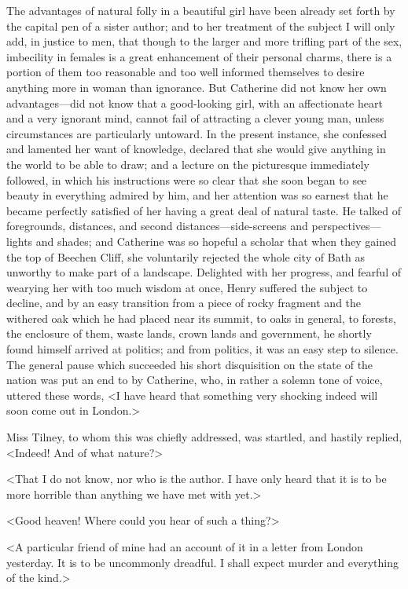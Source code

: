  The advantages of natural folly in a beautiful girl have been already set forth by the capital pen of a sister author; and to her treatment of the subject I will only add, in justice to men, that though to the larger and more trifling part of the sex, imbecility in females is a great enhancement of their personal charms, there is a portion of them too reasonable and too well informed themselves to desire anything more in woman than ignorance. But Catherine did not know her own advantages—did not know that a good-looking girl, with an affectionate heart and a very ignorant mind, cannot fail of attracting a clever young man, unless circumstances are particularly untoward. In the present instance, she confessed and lamented her want of knowledge, declared that she would give anything in the world to be able to draw; and a lecture on the picturesque immediately followed, in which his instructions were so clear that she soon began to see beauty in everything admired by him, and her attention was so earnest that he became perfectly satisfied of her having a great deal of natural taste. He talked of foregrounds, distances, and second distances—side-screens and perspectives—lights and shades; and Catherine was so hopeful a scholar that when they gained the top of Beechen Cliff, she voluntarily rejected the whole city of Bath as unworthy to make part of a landscape. Delighted with her progress, and fearful of wearying her with too much wisdom at once, Henry suffered the subject to decline, and by an easy transition from a piece of rocky fragment and the withered oak which he had placed near its summit, to oaks in general, to forests, the enclosure of them, waste lands, crown lands and government, he shortly found himself arrived at politics; and from politics, it was an easy step to silence. The general pause which succeeded his short disquisition on the state of the nation was put an end to by Catherine, who, in rather a solemn tone of voice, uttered these words, <I have heard that something very shocking indeed will soon come out in London.> 

 Miss Tilney, to whom this was chiefly addressed, was startled, and hastily replied, <Indeed! And of what nature?> 

 <That I do not know, nor who is the author. I have only heard that it is to be more horrible than anything we have met with yet.> 

 <Good heaven! Where could you hear of such a thing?> 

 <A particular friend of mine had an account of it in a letter from London yesterday. It is to be uncommonly dreadful. I shall expect murder and everything of the kind.> 

